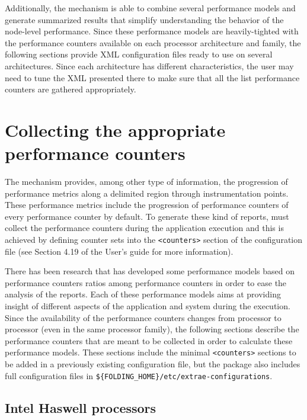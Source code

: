 Additionally, the \FOLDING mechanism is able to combine several performance models and generate summarized results that simplify understanding the behavior of the node-level performance.
Since these performance models are heavily-tighted with the performance counters available on each processor architecture and family, the following sections provide \EXTRAE XML configuration files ready to use on several architectures.
Since each architecture has different characteristics, the user may need to tune the XML presented there to make sure that all the list performance counters are gathered appropriately.

\section{Collecting the appropriate performance counters}\label{sec:CollectingAppropriatePerformanceCounters}

The \FOLDING mechanism provides, among other type of information, the progression of performance metrics along a delimited region through instrumentation points.
These performance metrics include the progression of performance counters of every performance counter by default.
To generate these kind of reports, \EXTRAE must collect the performance counters during the application execution and this is achieved by defining counter sets into the \texttt{<counters>} section of the \EXTRAE configuration file (see Section 4.19 of the \EXTRAE User's guide for more information).

There has been research that has developed some performance models based on performance counters ratios among performance counters in order to ease the analysis of the reports.
Each of these performance models aims at providing insight of different aspects of the application and system during the execution.
Since the availability of the performance counters changes from processor to processor (even in the same processor family), the following sections describe the performance counters that are meant to be collected in order to calculate these performance models.
These sections include the minimal \texttt{<counters>} sections to be added in a previously existing \EXTRAE configuration file, but the \FOLDING package also includes full \EXTRAE configuration files in \texttt{\$\{FOLDING\_HOME\}/etc/extrae-configurations}.

\subsection{Intel Haswell processors}

